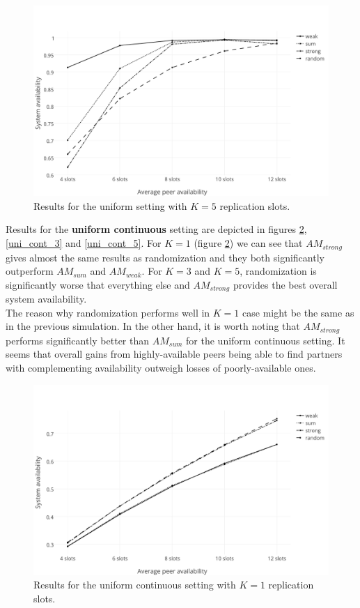 \documentclass{pracamgren}
\begin{document}
\begin{figure}[h]
\centering
\includegraphics[scale=0.5]{graphs/uniform_5.pdf}
\caption{Results for the uniform setting with $K=5$ replication slots.}
\label{uniform_5}
\end{figure}


Results for the {\bf uniform continuous} setting are depicted in figures \ref{uni_cont_1}, \ref{uni_cont_3} and \ref{uni_cont_5}. For $K=1$ (figure \ref{uni_cont_1}) we can see that $AM_{strong}$ gives almost the same results as randomization and they both significantly outperform $AM_{sum}$ and $AM_{weak}$. For $K=3$ and $K=5$, randomization is significantly worse that everything else and $AM_{strong}$ provides the best overall system availability.\\

The reason why randomization performs well in $K=1$ case might be the same as in the previous simulation. In the other hand, it is worth noting that $AM_{strong}$ performs significantly better than $AM_{sum}$ for the uniform continuous setting. It seems that overall gains from highly-available peers being able to find partners with complementing availability outweigh losses of poorly-available ones.\\

\begin{figure}[h]
\centering
\includegraphics[scale=0.5]{graphs/uni_cont_1.pdf}
\caption{Results for the uniform continuous setting with $K=1$ replication slots.}
\label{uni_cont_1}
\end{figure}
\end{document}
